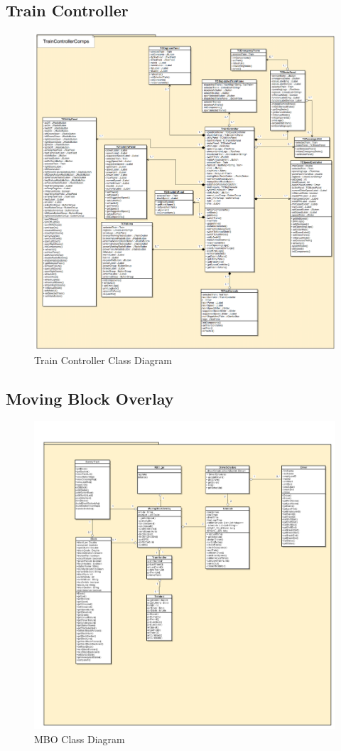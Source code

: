 \documentclass[]{article}
\begin{document}
\subsection{Train Controller}
\begin{figure}[H]
	\centering
	\includegraphics[width=\textwidth]{tc_classdiagram.png}
	\caption{Train Controller Class Diagram}
\end{figure}
\subsection{Moving Block Overlay}
\begin{figure}[H]
	\centering
	\includegraphics[width=\textwidth]{mbo.png}
	\caption{MBO Class Diagram}
\end{figure}
\end{document}
